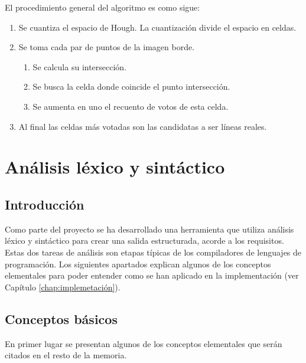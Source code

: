 El procedimiento general del algoritmo es como sigue:

\begin{enumerate}
    \item Se cuantiza el espacio de Hough. La cuantización divide el espacio en celdas.
    \item Se toma cada par de puntos de la imagen borde.
    \begin{enumerate}
        \item Se calcula su intersección.
        \item Se busca la celda donde coincide el punto intersección.
        \item Se aumenta en uno el recuento de votos de esta celda.
    \end{enumerate}
    \item Al final las celdas más votadas son las candidatas a ser líneas reales.
\end{enumerate}

\section{Análisis léxico y sintáctico}

\subsection{Introducción}

Como parte del proyecto se ha desarrollado una herramienta que utiliza análisis léxico y sintáctico para crear una salida estructurada, acorde a los requisitos. Estas dos tareas de análisis son etapas típicas de los compiladores de lenguajes de programación. Los siguientes apartados explican algunos de los conceptos elementales para poder entender como se han aplicado en la implementación (ver Capítulo \ref{chap:implemetación}).

\subsection{Conceptos básicos}

En primer lugar se presentan algunos de los conceptos elementales que serán citados en el resto de la memoria.

